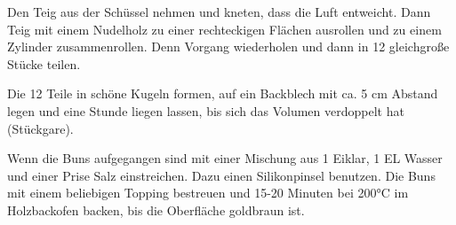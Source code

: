 Den Teig aus der Schüssel nehmen und kneten, dass die Luft entweicht. Dann Teig
mit einem Nudelholz zu einer rechteckigen Flächen ausrollen und zu einem Zylinder 
zusammenrollen. Denn Vorgang wiederholen und dann in 12 gleichgroße Stücke teilen.

Die 12 Teile in schöne Kugeln formen, auf ein Backblech mit ca. 5 cm Abstand legen
und eine Stunde liegen lassen, bis sich das Volumen verdoppelt hat (Stückgare).

Wenn die Buns aufgegangen sind mit einer Mischung aus 1 Eiklar, 1 EL Wasser und einer 
Prise Salz einstreichen. Dazu einen Silikonpinsel benutzen. Die Buns mit einem beliebigen
Topping bestreuen und 15-20 Minuten bei 200°C im Holzbackofen backen, bis die 
Oberfläche goldbraun ist.
